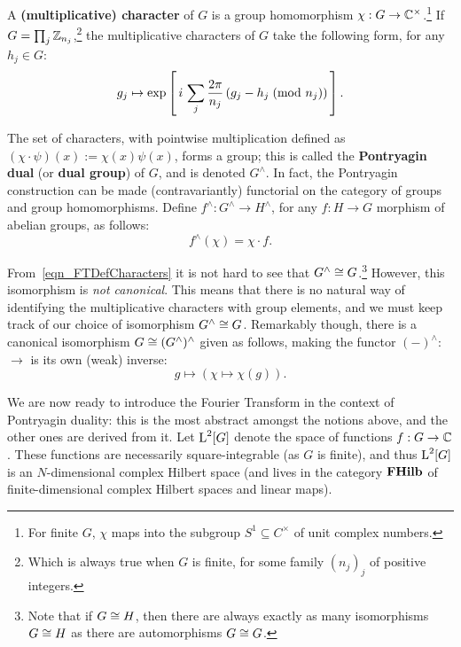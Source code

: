 A \textbf{(multiplicative) character} of $G$ is a group homomorphism $\chi:G\to \mathbb{C}^\times$.\footnote{For finite $G$, $\chi$ maps into the subgroup $S^1 \subseteq C^\times$ of unit complex numbers.} If $G = \prod_j \mathbb{Z}_{n_j}$,\footnote{Which is always true when $G$ is finite, for some family $(n_j)_j$ of positive integers.} the multiplicative characters of $G$ take the following form, for any $h_j \in G$:
\begin{equation}
\label{eqn:FTDefCharacters}
  g_j \mapsto \exp\left[\, i \, \sum_j \frac{2 \pi}{n_j} \left(g_j-h_j \; (\text{mod } n_j)\right) \, \right].
\end{equation}

The set of characters, with pointwise multiplication defined as $(\chi\cdot\psi)(x):=\chi(x)\psi(x)$, forms a group; this is called the \textbf{Pontryagin dual} (or \textbf{dual group}) of $G$, and is denoted $G^\wedge$. In fact, the Pontryagin construction can be made (contravariantly) functorial on the category  of groups and group homomorphisms. Define $f^\wedge : G^\wedge \rightarrow H^\wedge$, for any $f: H \rightarrow G$ morphism of abelian groups, as follows:
\begin{equation*}
  f^\wedge( \chi ) = \chi \cdot f.
\end{equation*}

From~\eqref{eqn_FTDefCharacters} it is not hard to see that $G^\wedge \cong G$.\footnote{Note that if $G \cong H$, then there are always exactly as many isomorphisms $G \cong H$ as there are automorphisms $G \cong G$.} However, this isomorphism is \emph{not canonical}. This means that there is no natural way of identifying the multiplicative characters with group elements, and we must keep track of our choice of isomorphism $G^\wedge \cong G$. Remarkably though, there is a canonical isomorphism $G \cong (G^\wedge)^\wedge$ given as follows, making the functor $(-)^{\wedge}:$  $\to$  is its own (weak) inverse:
\begin{equation*}
  g \mapsto (\chi \mapsto \chi(g)).
\end{equation*}

\newcommand{\FourierTransformSym}[1]{\mathcal{F}_{#1}}
\newcommand{\InverseFourierTransformSym}[1]{\mathcal{F}_{#1}^{-1}}
\newcommand{\FourierTransform}[1]{\mathcal{F}_G[#1]}
\newcommand{\InverseFourierTransform}[1]{\mathcal{F}_G^{-1}[#1]}

We are now ready to introduce the Fourier Transform in the context of Pontryagin duality: this is the most abstract amongst the notions above, and the other ones are derived from it. Let $\operatorname{L}^2[G]$ denote the space of functions $f:G\to \mathbb{C}$. These functions are necessarily square-integrable (as $G$ is finite), and thus $\operatorname{L}^2[G]$ is an $N$-dimensional complex Hilbert space (and lives in the category $\mathbf{FHilb}$ of finite-dimensional complex Hilbert spaces and linear maps). 

